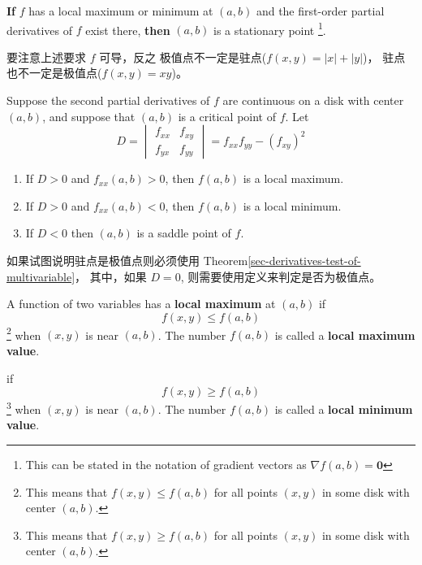 \begin{theorem}
    \textbf{If} $f$ has a local maximum or minimum at $(a, b)$ and the 
    first-order partial derivatives of $f$ exist there, 
    \textbf{then} $(a, b)$ is a stationary point
    \footnote{
        This can be stated in the notation 
        of gradient vectors as $\nabla f(a, b) = \mathbf{0}$
    }.
\end{theorem}

要注意上述要求 $f$ 可导，反之
极值点不一定是驻点($f(x, y) = |x|+|y|$)，
驻点也不一定是极值点($f(x, y) = xy$)。

\begin{theorem}
    \label{sec-derivatives-test-of-multivariable}
    Suppose the second partial derivatives of $f$ are continuous
    on a disk with center $(a, b)$, and suppose that
    $(a, b)$ is a critical point of $f$.
    Let 
    \[
        D = \begin{vmatrix}
            f_{xx} & f_{xy} \\
            f_{yx} & f_{yy}
        \end{vmatrix}
        = f_{xx}f_{yy} - (f_{xy})^2
    \]
    \begin{enumerate}
        \item If $D > 0$ and $f_{xx}(a, b) > 0$, then $f(a, b)$ is a local maximum.
        \item If $D > 0$ and $f_{xx}(a, b) < 0$, then $f(a, b)$ is a local minimum.
        \item If $D < 0$ then $(a, b)$ is a saddle point of $f$.
    \end{enumerate}
\end{theorem}

如果试图说明驻点是极值点则必须使用 Theorem\ref{sec-derivatives-test-of-multivariable}，
其中，如果 $D = 0$, 则需要使用定义来判定是否为极值点。

\begin{definition}
    \label{def:max-min-val-multivariable}
    A function of two variables has a \textbf{local maximum} at $(a, b)$
    if 
    \[
        f(x, y) \leq f(a, b)
    \]
    \footnote{
        This means that $f(x, y) \leq f(a, b)$ for all points 
        $(x, y)$ in some disk with center $(a, b)$.
    }
    when $(x, y)$ is near $(a, b)$.
    The number $f(a, b)$ is called a \textbf{local maximum value}.

    if 
    \[
        f(x, y) \geq f(a, b)
    \]
    \footnote{
        This means that $f(x, y) \geq f(a, b)$ for all points 
        $(x, y)$ in some disk with center $(a, b)$.
    }
    when $(x, y)$ is near $(a, b)$.
    The number $f(a, b)$ is called a \textbf{local minimum value}.
\end{definition}

